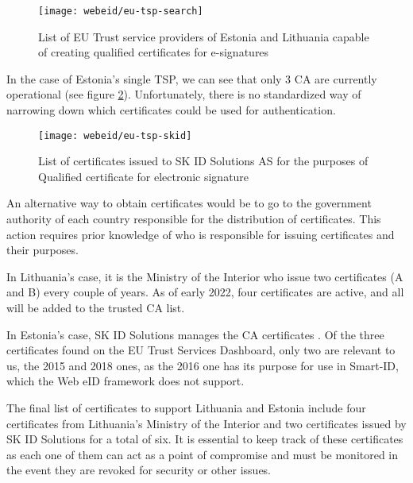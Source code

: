 \begin{figure}
  \centering
  \texttt{[image: webeid/eu-tsp-search]}
  \caption{List of EU Trust service providers of Estonia and Lithuania capable of creating qualified certificates for e-signatures}
  \label{fig:eu-tsp-list}
\end{figure}

In the case of Estonia's single TSP, we can see that only 3 CA are currently operational (see figure \ref{fig:eu-tsp-skid}). Unfortunately, there is no standardized way of narrowing down which certificates could be used for authentication.

\begin{figure}
  \centering
  \texttt{[image: webeid/eu-tsp-skid]}
  \caption{List of certificates issued to SK ID Solutions AS for the purposes of Qualified certificate for electronic signature}
  \label{fig:eu-tsp-skid}
\end{figure}

An alternative way to obtain certificates would be to go to the government authority of each country responsible for the distribution of certificates. This action requires prior knowledge of who is responsible for issuing certificates and their purposes.

In Lithuania's case, it is the Ministry of the Interior \cite{eid-lt-ministryofinterior-certificates} who issue two certificates (A and B) every couple of years. As of early 2022, four certificates are active, and all will be added to the trusted CA list.

In Estonia's case, SK ID Solutions manages the CA certificates \cite{eid-ee-skid-certificates}. Of the three certificates found on the EU Trust Services Dashboard, only two are relevant to us, the 2015 and 2018 ones, as the 2016 one has its purpose for use in Smart-ID, which the Web eID framework does not support.

The final list of certificates to support Lithuania and Estonia include four certificates from Lithuania's Ministry of the Interior and two certificates issued by SK ID Solutions for a total of six. It is essential to keep track of these certificates as each one of them can act as a point of compromise and must be monitored in the event they are revoked for security \cite{roca-vulnerability-lessons-learned} or other issues.


